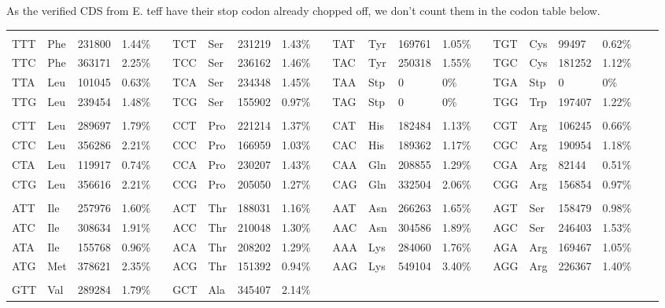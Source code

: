 As the verified CDS from E. teff have their stop codon already chopped off, we don't count them in the codon table below.\\
\begin{table}
\begin{center}
{\tiny
\begin{tabular}{*{21}{l}}
\hline
\\
TTT & Phe & 231800	& 1.44\%	&	&
TCT & Ser & 231219	& 1.43\%	&	&
TAT & Tyr & 169761	& 1.05\%	&	&
TGT & Cys & 99497	& 0.62\%	&	&
\\
TTC & Phe & 363171	& 2.25\%	&	&
TCC & Ser & 236162	& 1.46\%	&	&
TAC & Tyr & 250318	& 1.55\%	&	&
TGC & Cys & 181252	& 1.12\%	&	&
\\
TTA & Leu & 101045	& 0.63\%	&	&
TCA & Ser & 234348	& 1.45\%	&	&
TAA & Stp & 0	& 0\%	&	&
TGA & Stp & 0	& 0\%	&	&
\\
TTG & Leu & 239454	& 1.48\%	&	&
TCG & Ser & 155902	& 0.97\%	&	&
TAG & Stp & 0	& 0\%	&	&
TGG & Trp & 197407	& 1.22\%	&	&
\\
\\
CTT & Leu & 289697	& 1.79\%	&	&
CCT & Pro & 221214	& 1.37\%	&	&
CAT & His & 182484	& 1.13\%	&	&
CGT & Arg & 106245	& 0.66\%	&	&
\\
CTC & Leu & 356286	& 2.21\%	&	&
CCC & Pro & 166959	& 1.03\%	&	&
CAC & His & 189362	& 1.17\%	&	&
CGC & Arg & 190954	& 1.18\%	&	&
\\
CTA & Leu & 119917	& 0.74\%	&	&
CCA & Pro & 230207	& 1.43\%	&	&
CAA & Gln & 208855	& 1.29\%	&	&
CGA & Arg & 82144	& 0.51\%	&	&
\\
CTG & Leu & 356616	& 2.21\%	&	&
CCG & Pro & 205050	& 1.27\%	&	&
CAG & Gln & 332504	& 2.06\%	&	&
CGG & Arg & 156854	& 0.97\%	&	&
\\
\\
ATT & Ile & 257976	& 1.60\%	&	&
ACT & Thr & 188031	& 1.16\%	&	&
AAT & Asn & 266263	& 1.65\%	&	&
AGT & Ser & 158479	& 0.98\%	&	&
\\
ATC & Ile & 308634	& 1.91\%	&	&
ACC & Thr & 210048	& 1.30\%	&	&
AAC & Asn & 304586	& 1.89\%	&	&
AGC & Ser & 246403	& 1.53\%	&	&
\\
ATA & Ile & 155768	& 0.96\%	&	&
ACA & Thr & 208202	& 1.29\%	&	&
AAA & Lys & 284060	& 1.76\%	&	&
AGA & Arg & 169467	& 1.05\%	&	&
\\
ATG & Met & 378621	& 2.35\%	&	&
ACG & Thr & 151392	& 0.94\%	&	&
AAG & Lys & 549104	& 3.40\%	&	&
AGG & Arg & 226367	& 1.40\%	&	&
\\
\\
GTT & Val & 289284	& 1.79\%	&	&
GCT & Ala & 345407	& 2.14\%	&	&

\end{tabular}}
\end{center}
\end{table}
